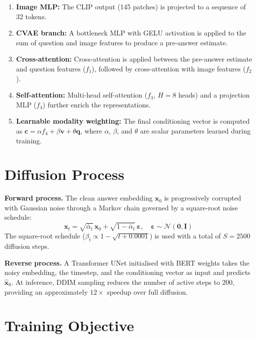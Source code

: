 \documentclass[9pt]{report}
\begin{document}
\begin{enumerate}
    \item \textbf{Image MLP:} The CLIP output (145 patches) is projected to a sequence of 32 tokens.
    \item \textbf{CVAE branch:} A bottleneck MLP with GELU activation is applied to the sum of question and image features to produce a pre-answer estimate.
    \item \textbf{Cross-attention:} Cross-attention is applied between the pre-answer estimate and question features ($f_1$), followed by cross-attention with image features ($f_2$).
    \item \textbf{Self-attention:} Multi-head self-attention ($f_3$, $H=8$ heads) and a projection MLP ($f_4$) further enrich the representations.
    \item \textbf{Learnable modality weighting:} The final conditioning vector is computed as $\mathbf{c} = \alpha f_4 + \beta \mathbf{v} + \theta \mathbf{q}$, where $\alpha$, $\beta$, and $\theta$ are scalar parameters learned during training.
\end{enumerate}

\section{Diffusion Process}

\textbf{Forward process.} The clean answer embedding $\mathbf{x}_0$ is progressively corrupted with Gaussian noise through a Markov chain governed by a square-root noise schedule:
\begin{equation}
    \mathbf{x}_t = \sqrt{\bar{\alpha}_t}\,\mathbf{x}_0 + \sqrt{1 - \bar{\alpha}_t}\,\boldsymbol{\varepsilon}, \quad \boldsymbol{\varepsilon} \sim \mathcal{N}(\mathbf{0}, \mathbf{I})
\end{equation}
The square-root schedule ($\beta_t \propto 1 - \sqrt{t + 0.0001}$) is used with a total of $S = 2500$ diffusion steps.

\textbf{Reverse process.} A Transformer UNet initialised with BERT weights takes the noisy embedding, the timestep, and the conditioning vector as input and predicts $\hat{\mathbf{x}}_0$. At inference, DDIM sampling reduces the number of active steps to 200, providing an approximately $12\times$ speedup over full diffusion.

\section{Training Objective}
\end{document}
